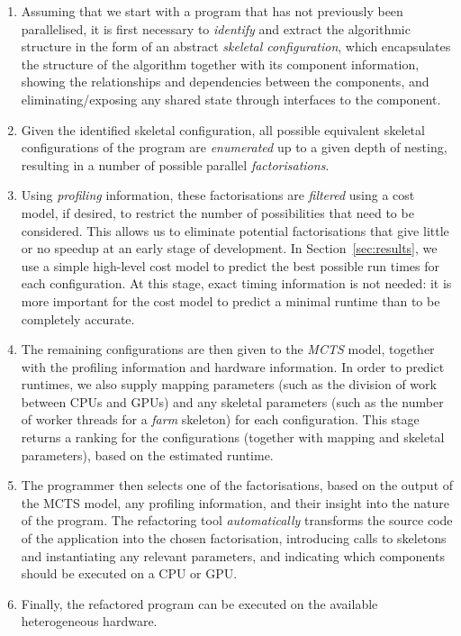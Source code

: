 \documentclass[smallextended]{svjour3}
\begin{document}
\begin{enumerate}
\item Assuming that we start with a program that has not previously been parallelised, 
  it is first necessary to
  \emph{identify} and extract the algorithmic structure in the form of an
  abstract \emph{skeletal configuration}, which encapsulates the
  structure of the algorithm together with its component information,
  showing the relationships and dependencies between the components,
  and eliminating/exposing any shared state through interfaces to the component.
\item Given the identified skeletal configuration, all possible
  equivalent skeletal configurations of the program are \emph{enumerated} up to
  a given depth of nesting, resulting in a number of possible parallel \emph{factorisations}.
\item Using \emph{profiling} information, these factorisations are \emph{filtered} using a cost model, if desired,
  to restrict the number of possibilities that need to be considered.
  This allows us to eliminate potential factorisations that give little or no
  speedup at an early stage of development.  In
  Section~\ref{sec:results}, we use a simple high-level cost model to predict
  the best possible run times for each configuration. At
  this stage, exact timing information is not needed: it is more important for the cost model to predict a
  minimal runtime than to be completely accurate.
\item The remaining configurations are then given to the \emph{MCTS} model, together with the profiling
  information and hardware information.
  In order to
  predict runtimes, we also supply mapping parameters (such as the division of work
  between CPUs and GPUs) and any skeletal parameters (such as the
  number of worker threads for a \emph{farm} skeleton) for each
  configuration. This stage returns a ranking for the
  configurations (together with mapping and skeletal parameters),
  based on the estimated runtime.
\item The programmer then selects one of the factorisations, based on the
  output of the MCTS model, any profiling information, and their insight
  into the nature of the program.  The refactoring tool
  \emph{automatically} transforms the source code of the application into
  the chosen factorisation, introducing calls to skeletons and
  instantiating any relevant parameters, and indicating 
  which components should be executed on a CPU or GPU.
\item Finally, the refactored program can be executed on the available heterogeneous hardware. 
\end{enumerate}
\end{document}
